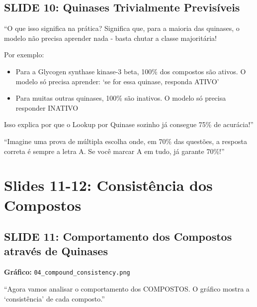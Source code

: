 \documentclass[11pt,a4paper]{article}
\begin{document}
\subsection{SLIDE 10: Quinases Trivialmente Previsíveis}

\begin{oquedizer}
``O que isso significa na prática? Significa que, para a maioria das quinases, o modelo não precisa aprender nada - basta chutar a classe majoritária!

Por exemplo:
\begin{itemize}
    \item Para a Glycogen synthase kinase-3 beta, 100\% dos compostos são ativos. O modelo só precisa aprender: `se for essa quinase, responda ATIVO'
    \item Para muitas outras quinases, 100\% são inativos. O modelo só precisa responder INATIVO
\end{itemize}

Isso explica por que o Lookup por Quinase sozinho já consegue 75\% de acurácia!''
\end{oquedizer}

\begin{analogia}
``Imagine uma prova de múltipla escolha onde, em 70\% das questões, a resposta correta é sempre a letra A. Se você marcar A em tudo, já garante 70\%!''
\end{analogia}

\section{Slides 11-12: Consistência dos Compostos}

\subsection{SLIDE 11: Comportamento dos Compostos através de Quinases}

\textbf{Gráfico:} \texttt{04\_compound\_consistency.png}

\begin{oquedizer}
``Agora vamos analisar o comportamento dos COMPOSTOS. O gráfico mostra a `consistência' de cada composto.''
\end{oquedizer}
\end{document}
